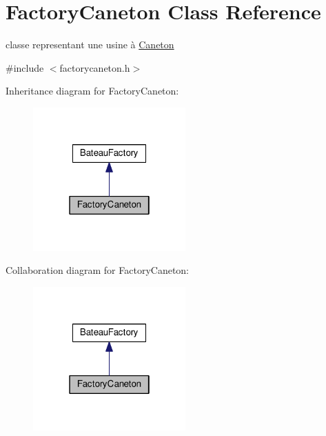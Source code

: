 \hypertarget{classFactoryCaneton}{\section{Factory\+Caneton Class Reference}
\label{classFactoryCaneton}
}


classe representant une usine à \hyperlink{classCaneton}{Caneton}  




{\ttfamily \#include $<$factorycaneton.\+h$>$}



Inheritance diagram for Factory\+Caneton\+:
\nopagebreak
\begin{figure}[H]
\begin{center}
\leavevmode
\includegraphics[width=166pt]{classFactoryCaneton__inherit__graph}
\end{center}
\end{figure}


Collaboration diagram for Factory\+Caneton\+:
\nopagebreak
\begin{figure}[H]
\begin{center}
\leavevmode
\includegraphics[width=166pt]{classFactoryCaneton__coll__graph}
\end{center}
\end{figure}
